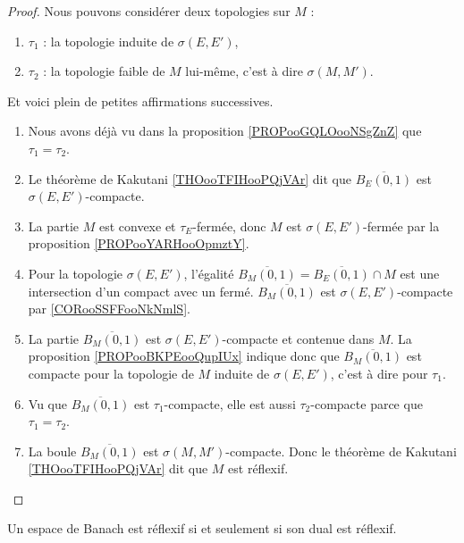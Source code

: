 \begin{proof}
	Nous pouvons considérer deux topologies sur \( M\) :
	\begin{enumerate}
		\item
		      \( \tau_1\) : la topologie induite de \( \sigma(E,E')\),
		\item
		      \( \tau_2\) : la topologie faible de \( M\) lui-même, c'est à dire \( \sigma(M,M')\).
	\end{enumerate}

	Et voici plein de petites affirmations successives.
	\begin{enumerate}
		\item
		      Nous avons déjà vu dans la proposition \ref{PROPooGQLOooNSgZnZ} que \( \tau_1=\tau_2\).
		\item
		      Le théorème de Kakutani \ref{THOooTFIHooPQjVAr} dit que \( \overline{B_E(0,1)}\) est \( \sigma(E,E')\)-compacte.
		\item
		      La partie \( M\) est convexe et \( \tau_E\)-fermée, donc \( M\) est \( \sigma(E,E')\)-fermée par la proposition \ref{PROPooYARHooOpmztY}.
		\item
		      Pour la topologie \( \sigma(E,E')\), l'égalité \( \overline{B_M(0,1)}=\overline{B_E(0,1)}\cap M\) est une intersection d'un compact avec un fermé. \( \overline{B_M(0,1)}\) est \( \sigma(E,E')\)-compacte par \ref{CORooSSFFooNkNmlS}.
		\item
		      La partie \( \overline{B_M(0,1)}\) est \( \sigma(E,E')\)-compacte et contenue dans \( M\). La proposition \ref{PROPooBKPEooQupIUx} indique donc que \( \overline{B_M(0,1)}\) est compacte pour la topologie de \( M\) induite de \( \sigma(E,E')\), c'est à dire pour \( \tau_1\).
		\item
		      Vu que \(  \overline{B_M(0,1)}  \) est \( \tau_1\)-compacte, elle est aussi \( \tau_2\)-compacte parce que \( \tau_1=\tau_2\).
		\item
		      La boule \( \overline{B_M(0,1)}\) est \( \sigma(M,M')\)-compacte. Donc le théorème de Kakutani \ref{THOooTFIHooPQjVAr} dit que \( M\) est réflexif.
	\end{enumerate}

\end{proof}

\begin{proposition}       \label{PROPooBBNBooGcXDRH}
	Un espace de Banach est réflexif si et seulement si son dual est réflexif.
\end{proposition}

